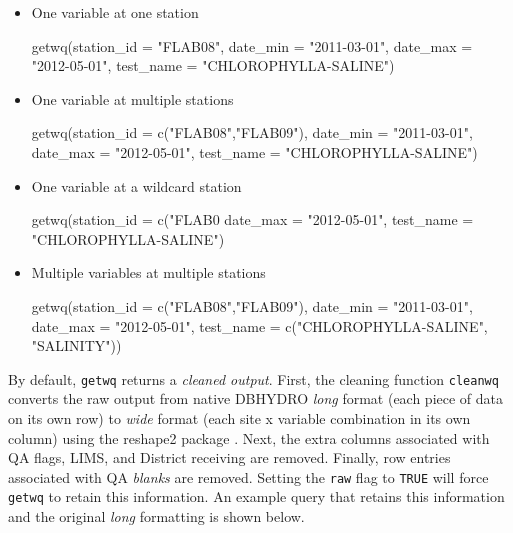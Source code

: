 \documentclass[12pt,notitlepage]{article}
\begin{document}
\begin{itemize}
\item One variable at one station

\begin{Schunk}
\begin{Sinput}
 getwq(station_id = "FLAB08", date_min = "2011-03-01", 
       date_max = "2012-05-01", test_name = "CHLOROPHYLLA-SALINE")
\end{Sinput}
\end{Schunk}

\item One variable at multiple stations

\begin{Schunk}
\begin{Sinput}
 getwq(station_id = c("FLAB08","FLAB09"), date_min = "2011-03-01",
       date_max = "2012-05-01", test_name = "CHLOROPHYLLA-SALINE")
\end{Sinput}
\end{Schunk}

\item One variable at a wildcard station

\begin{Schunk}
\begin{Sinput}
 getwq(station_id = c("FLAB0%
       date_max = "2012-05-01", test_name = "CHLOROPHYLLA-SALINE")
\end{Sinput}
\end{Schunk}

\item Multiple variables at multiple stations

\begin{Schunk}
\begin{Sinput}
 getwq(station_id = c("FLAB08","FLAB09"), date_min = "2011-03-01",
       date_max = "2012-05-01", test_name = c("CHLOROPHYLLA-SALINE",
       "SALINITY"))
\end{Sinput}
\end{Schunk}

\end{itemize}

\noindent By default, \verb|getwq| returns a \textit{cleaned output}. First, the cleaning function \verb|cleanwq| converts the raw output from native DBHYDRO \textit{long} format (each piece of data on its own row) to \textit{wide} format (each site x variable combination in its own column) using the reshape2 package \citep{reshape2}. Next, the extra columns associated with QA flags, LIMS, and District receiving are removed. Finally, row entries associated with QA \textit{blanks} are removed. Setting the \texttt{raw} flag to \texttt{TRUE} will force \verb|getwq| to retain this information. An example query that retains this information and the original \textit{long} formatting is shown below.
\end{document}
